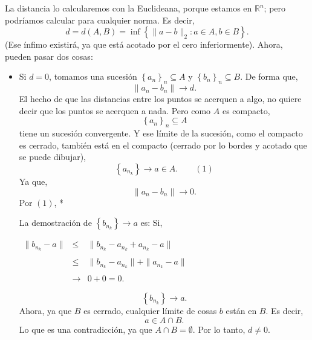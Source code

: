 \begin{paracol}{2}
\begin{teo}
	La distancia lo calcularemos con la Euclideana, porque estamos en $\mathbb{R}^n$; pero podríamos calcular para cualquier norma. Es decir,
	$$d=d(A,B)=\inf\left\{\|a-b\|_2:a\in A, b\in B\right\}.$$
	(Ese ínfimo existirá, ya que está acotado por el cero inferiormente). Ahora, pueden pasar dos cosas: 
    \begin{itemize}
	\item Si $d=0$, tomamos una sucesión $\left\{a_n\right\}_n\subseteq A$ y $\left\{b_n\right\}_n \subseteq B$. De forma que,
	    $$\|a_n-b_n\|\to  d.$$
	    El hecho de que las distancias entre los puntos se acerquen a algo, no quiere decir que los puntos se acerquen a nada. Pero como $A$ es compacto, 
	    $$\left\{a_n\right\}_n\subseteq A$$
	    tiene un sucesión convergente. Y ese límite de la sucesión, como el compacto es cerrado, también está en el compacto (cerrado por lo bordes y acotado que se puede dibujar),
	    $$\left\{a_{n_k}\right\}\to a\in A. \qquad (1)$$
	    Ya que,
	    $$\|a_n-b_n\|\to 0.$$
	    Por $(1)$,  
	    \switchcolumn[1]*{\noindent\scriptsize
		La demostración de $\left\{b_{n_k}\right\}\to a$ es: Si,

		$
		\begin{array}{rcl}
		    \|b_{n_k}-a\|&\leq& \|b_{n_k}-a_{n_k}+a_{n_k}-a\|\\\\
				 &\leq& \|b_{n_k}-a_{n_k}\|+\|a_{n_k}-a\|\\\\
				 &\to& 0+0=0.
		\end{array}
		$
	    }
	    \switchcolumn[0]
	    $$\left\{b_{n_k}\right\}\to a.$$
	    Ahora, ya que $B$ es cerrado, cualquier límite de cosas $b$ están en $B$. Es decir,
	    $$a\in A\cap B.$$
	    Lo que es una contradicción, ya que $A\cap B=\emptyset$. Por lo tanto, $d\neq 0$.


\end{itemize}
\end{teo}
\end{paracol}
